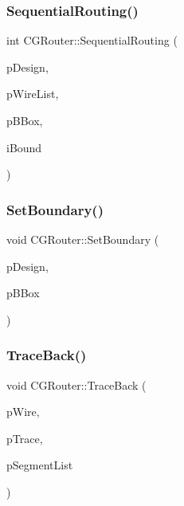 \mbox{\label{classCGRouter_a2d4926771b5862045dd154782f478809}} 
\subsubsection{\texorpdfstring{SequentialRouting()}{SequentialRouting()}}
{\footnotesize\ttfamily int C\+G\+Router\+::\+Sequential\+Routing (\begin{DoxyParamCaption}\item[{\mbox{\hyperlink{classCDesign}{C\+Design}} $\ast$}]{p\+Design,  }\item[{vector$<$ \mbox{\hyperlink{classCWire}{C\+Wire}} $\ast$ $>$ $\ast$}]{p\+Wire\+List,  }\item[{\mbox{\hyperlink{classCBBox}{C\+B\+Box}} $\ast$}]{p\+B\+Box,  }\item[{int}]{i\+Bound }\end{DoxyParamCaption})\hspace{0.3cm}{\ttfamily [static]}}

\mbox{\label{classCGRouter_a831631d047b63b52b1c2a50182abaad6}} 
\subsubsection{\texorpdfstring{SetBoundary()}{SetBoundary()}}
{\footnotesize\ttfamily void C\+G\+Router\+::\+Set\+Boundary (\begin{DoxyParamCaption}\item[{\mbox{\hyperlink{classCDesign}{C\+Design}} $\ast$}]{p\+Design,  }\item[{\mbox{\hyperlink{classCBBox}{C\+B\+Box}} $\ast$}]{p\+B\+Box }\end{DoxyParamCaption})\hspace{0.3cm}{\ttfamily [static]}}

\mbox{\label{classCGRouter_a7e4f43c1a3a3ef2727c69e360f5998bf}} 
\subsubsection{\texorpdfstring{TraceBack()}{TraceBack()}}
{\footnotesize\ttfamily void C\+G\+Router\+::\+Trace\+Back (\begin{DoxyParamCaption}\item[{\mbox{\hyperlink{classCWire}{C\+Wire}} $\ast$}]{p\+Wire,  }\item[{vector$<$ \mbox{\hyperlink{classCGrid}{C\+Grid}} $\ast$ $>$ $\ast$}]{p\+Trace,  }\item[{vector$<$ \mbox{\hyperlink{classCSegment}{C\+Segment}} $\ast$ $>$ $\ast$}]{p\+Segment\+List }\end{DoxyParamCaption})\hspace{0.3cm}{\ttfamily [static]}}



